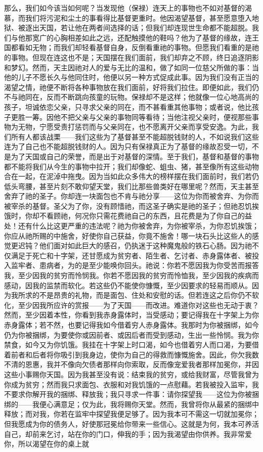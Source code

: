 那么，我们如今该当如何呢？当发现他（保禄）连天上的事物也不如对基督的渴慕，而我们将污泥和尘土的事看得比基督更重时。他因渴望基督，甚至愿意堕入地狱、被逐出天国，若让他在两者间选择的话；但我们却连现世生命都不能超脱。我们与他那宽广的心胸相差如此之远，还配触摸他的鞋吗？他为了基督的缘故，连王国都看如无物；而我们却轻看基督自身，反倒看重祂的事物。但愿我们看重的是祂的事物。但现在连这也不是；天国摆在我们面前，我们却弃之不顾，终日追逐阴影和梦幻。然而，天主因祂对人的爱与无比的温和，做了如同一位慈父所做的事：当他的儿子不愿长久与他同住时，他便以另一种方式促成此事。因为我们没有正当的渴望之情，祂便不断将各种事物放在我们面前，好将我们拉住。即便如此，我们仍不与祂同在，反而不断跳向孩童的玩物。保禄却不是这样；他就像一位心地高尚的孩子，坦诚依恋父亲，只寻求父亲的同在，而不甚看重其他事物；或者说，他比孩子更胜一筹。因他不把父亲与父亲的事物同等看待；当他注视父亲时，便视那些事物为无物，宁愿受责打惩罚而与父亲同在，也不愿离开父亲而享受安逸。为此，我们所有人都该战栗——我们这些为了基督甚至不能超脱钱财的人，不如说我们这些连为了自己也不能超脱钱财的人。因为只有保禄真正为了基督的缘故忍受一切，不是为了天国或自己的荣誉，而是出于对基督的深情。至于我们，基督和基督的事物都不能将我们从今生的事物中拉开；我们却像蛇、蛆虫、猪，甚至像所有这些动物合在一起，在泥淖中拖曳。因为当如此众多伟大的榜样摆在我们面前时，我们若仍低头弯腰，甚至片刻不敢仰望天堂，我们比那些兽类好在哪里呢？然而，天主甚至舍弃了祂的圣子。你却连一块面包也不肯与祂分享——这位为你而被舍弃、为你而被宰杀的基督。圣父为了你，没有顾惜祂，而这圣子确实是祂的圣子；但祂忍饥挨饿时，你却不看顾祂，何况你只需花费祂自己的东西，且花费是为了你自己的益处！还有什么比这更严重的违法呢？祂为你被舍弃，为你被宰杀，为你忍饥挨饿；你应从祂所赐的中施舍，好使你自己获益，你竟不施舍！哪一块石头比这些人的感觉更迟钝？他们面对如此巨大的感召，仍执迷于这种魔鬼般的铁石心肠。因为祂不仅满足于死亡和十字架，还甘愿成为贫穷者、陌生者、乞讨者、赤身露体者、被投入监牢者、患病者，为的是至少能唤你回头。祂说：你若不愿因我为你受苦而报答我，至少因我的贫穷而怜悯我。你若不愿因我的贫穷而怜恤我，至少因我的疾病而感动，因我的监禁而软化。若这些仍不能使你慷慨，至少因要求的轻易而顺从。因为我所求的不是昂贵的礼物，而是面包、住处和安慰的话。但若连这之后你仍不软化，至少因我所应许的赏报——为了天国——而改进。难道你对这些也无动于衷？然而，至少因着本性，你看到我赤身露体时，当受感动；要记得我在十字架上为你赤身露体；若不然，也要记得我如今借着穷人赤身露体。我那时为你被捆绑，如今仍为你被捆绑，为要使你或因前者、或因后者而受到感动，生出一些怜悯。我为你禁食，如今又为你饥饿。我挂在十字架上时口渴，如今也借着穷人而口渴，为要借着前者和后者将你吸引到我身边，使你为自己的得救而慷慨施舍。因此，你欠我数不清的恩惠，我并不像向欠债者那样向你索取，反而像宠爱我者那样加冕你，并因这些小事赐你天国。因为我甚至没有说：结束我的贫穷，或给我财富，尽管我曾为你成为贫穷；然而我只求面包、衣服和对我饥饿的一点慰藉。若我被投入监牢，我不要求你解开我的捆绑、释放我；我只寻求一件事：请你探望我——这位为你被捆绑的——我便心满意足；仅为此，我将赐你天堂。然而，我曾将你从最紧的捆绑中释放；而对我，你若在监牢中探望我便足够了。因为我本可不需这一切就加冕你；但我愿成为你的债务人，好使那冠冕给你带来一些信心。这就是为何，我本可养活自己，却前来乞讨，站在你的门口，伸我的手；因为我渴望由你供养。我非常爱你，所以渴望在你的桌上就